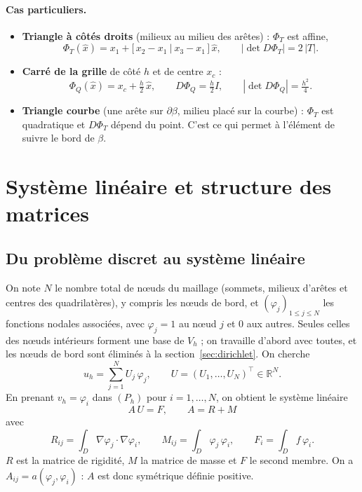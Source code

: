 \documentclass[11pt,a4paper]{article}
\begin{document}
\paragraph{Cas particuliers.}
\begin{itemize}
  \item \textbf{Triangle à côtés droits} (milieux au milieu des arêtes) : $\Phi_T$ est
        affine,
        \[
        \Phi_T(\hat{x}) = x_1 + \big[\, x_2 - x_1 \ \big|\ x_3 - x_1 \,\big]\, \hat{x},
        \qquad \left|\det D\Phi_T\right| = 2\,|T| .
        \]
  \item \textbf{Carré de la grille} de côté $h$ et de centre $x_c$ :
        \[
        \Phi_Q(\hat{x}) = x_c + \tfrac{h}{2}\, \hat{x},
        \qquad D\Phi_Q = \tfrac{h}{2} I,
        \qquad \left|\det D\Phi_Q\right| = \tfrac{h^2}{4} .
        \]
  \item \textbf{Triangle courbe} (une arête sur $\partial\beta$, milieu placé
        sur la courbe) : $\Phi_T$ est quadratique et $D\Phi_T$ dépend du point.
        C'est ce qui permet à l'élément de suivre le bord de $\beta$.
\end{itemize}

\section{Système linéaire et structure des matrices}

\subsection{Du problème discret au système linéaire}

On note $N$ le nombre total de nœuds du maillage (sommets, milieux
d'arêtes et centres des quadrilatères), y compris les nœuds de bord, et
$(\varphi_j)_{1 \le j \le N}$ les fonctions nodales associées, avec
$\varphi_j = 1$ au nœud $j$ et $0$ aux autres. Seules celles des nœuds
intérieurs forment une base de $V_h$ ; on travaille d'abord avec toutes,
et les nœuds de bord sont éliminés à la section~\ref{sec:dirichlet}.
On cherche
\[
u_h = \sum_{j=1}^{N} U_j\, \varphi_j ,
\qquad U = (U_1,\dots,U_N)^\top \in \mathbb{R}^N .
\]
En prenant $v_h = \varphi_i$ dans $(P_h)$ pour $i = 1,\dots,N$, on obtient
le système linéaire
\[
\boxed{\ A\,U = F, \qquad A = R + M\ }
\]
avec
\[
R_{ij} = \int_D \nabla\varphi_j \cdot \nabla\varphi_i ,
\qquad
M_{ij} = \int_D \varphi_j\, \varphi_i ,
\qquad
F_i = \int_D f\, \varphi_i .
\]
$R$ est la matrice de rigidité, $M$ la matrice de masse et $F$ le second
membre. On a $A_{ij} = a(\varphi_j, \varphi_i)$ : $A$ est donc symétrique
définie positive.
\end{document}
